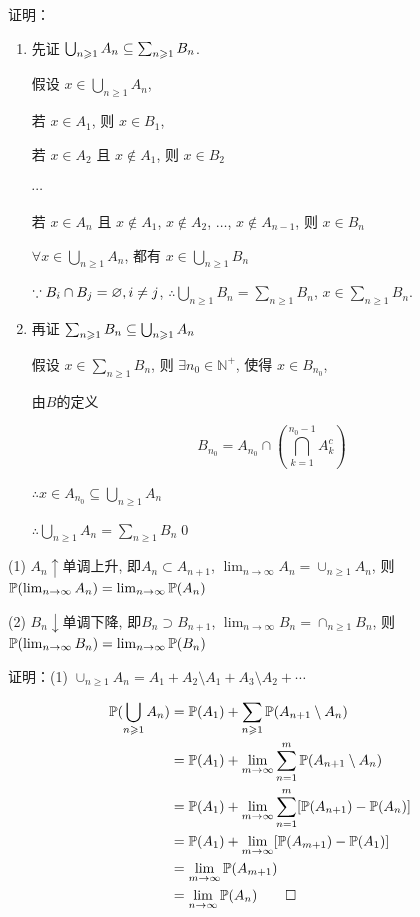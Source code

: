 证明：
\begin{enumerate}
    \item 先证 \(\bigcup_{n \geqslant 1} A_n \subseteq \sum_{n \geqslant 1} B_n\). 

    假设 \(x \in \bigcup_{n \geqslant 1} A_n\), 

    若 \(x \in A_1\), 则 \(x \in B_1\), 

    若 \(x \in A_2\) 且 \(x \notin A_1\), 则 \(x \in B_2\)

    $\cdots$

    若 \(x \in A_n\) 且 \(x \notin A_1\), \(x \notin A_2\), \(\ldots\), \(x \notin A_{n-1}\), 则 \(x \in B_n\)

    $\forall x\in \bigcup_{n\geq 1}A_n$, 都有 $x\in \bigcup_{n\geq 1}B_n$

    \(\because B_i \cap B_j = \varnothing,i\neq j\), \(\therefore \bigcup_{n \geqslant 1} B_n = \sum_{n \geqslant 1} B_n\), \(x \in \sum_{n \geqslant 1} B_n\). 

    \item 再证 \(\sum_{n \geqslant 1} B_n \subseteq \bigcup_{n \geqslant 1} A_n\)

    假设 \(x \in \sum_{n \geqslant 1} B_n\), 则 \(\exists n_0 \in \mathbb{N}^+\), 使得 \(x \in B_{n_0}\), 

    由$B$的定义

    \[
    B_{n_0} = A_{n_0} \cap \left( \bigcap_{k=1}^{n_0-1} A_k^c \right)
    \]

    \(\therefore x \in A_{n_0} \subseteq \bigcup_{n \geqslant 1} A_n\)

    \(\therefore \bigcup_{n \geqslant 1} A_n = \sum_{n \geqslant 1} B_n\)\qed
\end{enumerate}

\begin{property}[连续性]\label{prt:measure_continuity}
    (1) $A_n\uparrow$单调上升, 即$A_n\subset A_{n+1}$, $\lim_{n\rightarrow \infty}A_n=\cup_{n\geq 1}A_n$, 则 $\mathbb{P}(\lim_{n\rightarrow \infty}A_n)=\lim_{n\rightarrow \infty}\mathbb{P}(A_n)$

    (2) $B_n\downarrow$单调下降, 即$B_n\supset B_{n+1}$, $\lim_{n\rightarrow \infty}B_n=\cap_{n\geq 1}B_n$, 则 $\mathbb{P}(\lim_{n\rightarrow \infty}B_n)=\lim_{n\rightarrow \infty}\mathbb{P}(B_n)$
\end{property}

证明：(1) $\cup_{n\geq 1}A_n=A_1+A_2\setminus A_1+A_3\setminus A_2+\cdots$

\[
\begin{aligned}
    \mathbb{P}(\bigcup_{n\geqslant 1}A_n)&=\mathbb{P}(A_1)+\sum_{n\geqslant 1}\mathbb{P}(A_{n+1}\setminus A_n)\\
    &=\mathbb{P}(A_1)+\lim_{m \to \infty}\sum_{n=1}^m \mathbb{P}(A_{n+1}\setminus A_n)\\
    &=\mathbb{P}(A_1)+\lim_{m \to \infty}\sum_{n=1}^m [\mathbb{P}(A_{n+1})-\mathbb{P}(A_n)]\\
    &=\mathbb{P}(A_1)+\lim_{m \to \infty}[\mathbb{P}(A_{m+1})-\mathbb{P}(A_1)]\\
    &=\lim_{m \to \infty} \mathbb{P}(A_{m+1})\\
    &=\lim_{n \to \infty} \mathbb{P}(A_n)\qed
\end{aligned}
\]

